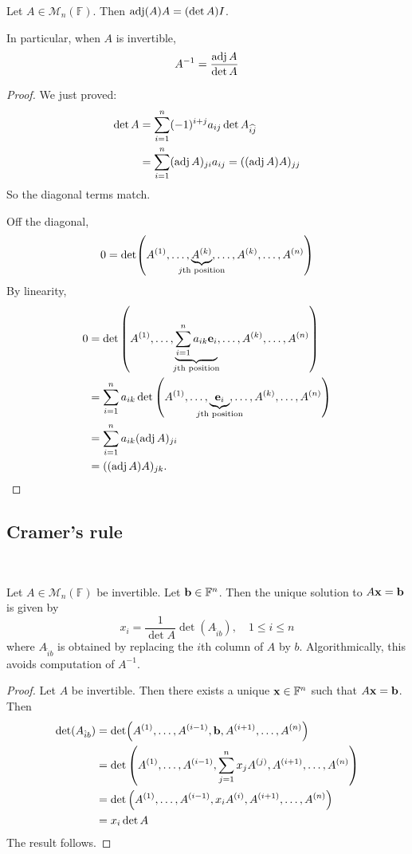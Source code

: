 \documentclass[a4paper]{article}
\begin{document}
\begin{theorem}
	Let $ A \in \mathcal{M}_n (\mathbb{F}) $. Then $ \operatorname{adj}(A) A = (\det A) I $. 
	
	In particular, when $ A $ is invertible,
	\[
		A^{-1} = \frac{\operatorname{adj} A}{\det A}
	\]
\end{theorem}
\begin{proof}
	We just proved:
	\begin{align*}
		\det A &= \sum_{i=1}^n (-1)^{i+j} a_{ij} \det A_{\widehat{ij}} \\
		&= \sum_{i=1}^n (\operatorname{adj} A)_{ji} a_{ij} = ((\operatorname{adj} A) A)_{jj}
	\end{align*}
	So the diagonal terms match.
	
	Off the diagonal,
	\[
		0 = \det(A^{(1)}, \dots, \underbrace{A^{(k)}}_{\mathclap{j\text{th position}}}, \dots, A^{(k)}, \dots, A^{(n)})
	\]
	By linearity,
	\begin{align*}
		0 & = \det\qty(A^{(1)}, \dots, \underbrace{\sum_{i=1}^n a_{ik} \bfe_i}_{\mathclap{j\text{th position}}}, \dots, A^{(k)}, \dots, A^{(n)}) \\
		  & = \sum_{i=1}^n a_{ik} \det\qty(A^{(1)}, \dots, \underbrace{\bfe_i}_{\mathclap{j\text{th position}}}, \dots, A^{(k)}, \dots, A^{(n)}) \\
		  & = \sum_{i=1}^n a_{ik} (\adj A)_{ji}                                                                                               \\
		  & = ((\adj A) A)_{jk}. \qedhere
	\end{align*}
\end{proof}

\subsection{Cramer's rule}\ \vspace{-1.5em}
\begin{proposition}
	Let $ A\in \mathcal{M}_n(\mathbb{F}) $ be invertible. 
	Let $ {\bf b} \in {\mathbb{F}}^n $.
	Then the unique solution to $ A{\bf x} = {\bf b} $ is given by
	\[
		x_i = \frac{1}{\det A} \det (A_{\hat{i}b}),\quad 1\le i\le n
	\]
	where $ A_{\hat{i}b} $ is obtained by replacing the $ i$th column of $ A $ by $ b $.
	Algorithmically, this avoids computation of $A^{-1}$. 
\end{proposition}

\begin{proof}
	Let $ A $ be invertible.
	Then there exists a unique $ {\bf x} \in {\mathbb{F}}^n $ such that $A {\bf x} = {\bf b} $.
	Then
	\begin{align*}
		\det (A_{\hat{i}b}) & = \det(A^{(1)}, \dots, A^{(i-1)}, {\bf b}, A^{(i+1)}, \dots, A^{(n)})                            \\
		                        & = \det\qty(A^{(1)}, \dots, A^{(i-1)}, \sum_{j=1}^n x_j A^{(j)}, A^{(i+1)}, \dots, A^{(n)}) \\
		                        & = \det\qty(A^{(1)}, \dots, A^{(i-1)}, x_i A^{(i)}, A^{(i+1)}, \dots, A^{(n)})              \\
		                        & = x_i \det A
	\end{align*}
	The result follows.
\end{proof}
\end{document}

